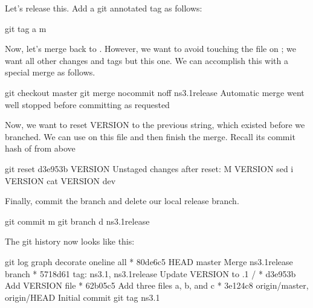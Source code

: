 \documentclass[letterpaper,10pt,english]{sphinxmanual}
\renewcommand{\sphinxcode}[1]{\texttt{\small{#1}}}
\begin{document}
Let’s release this.  Add a git annotated tag as follows:

\begin{sphinxVerbatim}[commandchars=\\\{\}]
\PYGZdl{} git tag \PYGZhy{}a  \PYGZhy{}m
\end{sphinxVerbatim}

Now, let’s merge back to \sphinxcode{}.  However, we want to avoid touching
the \sphinxcode{} file on \sphinxcode{}; we want all other changes and tags
but this one.  We can accomplish this with a special merge as follows.

\begin{sphinxVerbatim}[commandchars=\\\{\}]
\PYGZdl{} git checkout master
\PYGZdl{} git merge \PYGZhy{}\PYGZhy{}no\PYGZhy{}commit \PYGZhy{}\PYGZhy{}no\PYGZhy{}ff ns\PYGZhy{}3.1\PYGZhy{}release
Automatic merge went well stopped before committing as requested
\end{sphinxVerbatim}

Now, we want to reset VERSION to the previous string, which existed before
we branched.  We can use \sphinxcode{} on this file and then finish the merge.
Recall its commit hash of \sphinxcode{} from above

\begin{sphinxVerbatim}[commandchars=\\\{\}]
\PYGZdl{} git reset d3e953b VERSION
Unstaged changes after reset:
M     VERSION
\PYGZdl{} sed \PYGZhy{}i  VERSION
\PYGZdl{} cat VERSION
\PYGZhy{}dev
\end{sphinxVerbatim}

Finally, commit the branch and delete our local release branch.

\begin{sphinxVerbatim}[commandchars=\\\{\}]
\PYGZdl{} git commit \PYGZhy{}m
\PYGZdl{} git branch \PYGZhy{}d ns\PYGZhy{}3.1\PYGZhy{}release
\end{sphinxVerbatim}

The git history now looks like this:

\begin{sphinxVerbatim}[commandchars=\\\{\}]
\PYGZdl{} git log \PYGZhy{}\PYGZhy{}graph \PYGZhy{}\PYGZhy{}decorate \PYGZhy{}\PYGZhy{}oneline \PYGZhy{}\PYGZhy{}all
*   80de6c5 HEAD \PYGZhy{}\PYGZgt{} master Merge ns\PYGZhy{}3.1\PYGZhy{}release branch
 * 5718d61 tag: ns\PYGZhy{}3.1, ns\PYGZhy{}3.1\PYGZhy{}release Update VERSION to .1
/
* d3e953b Add VERSION file
* 62b05c5 Add three files a, b, and c
* 3e124c8 origin/master, origin/HEAD Initial commit
\PYGZdl{} git tag
ns\PYGZhy{}3.1
\end{sphinxVerbatim}
\end{document}
